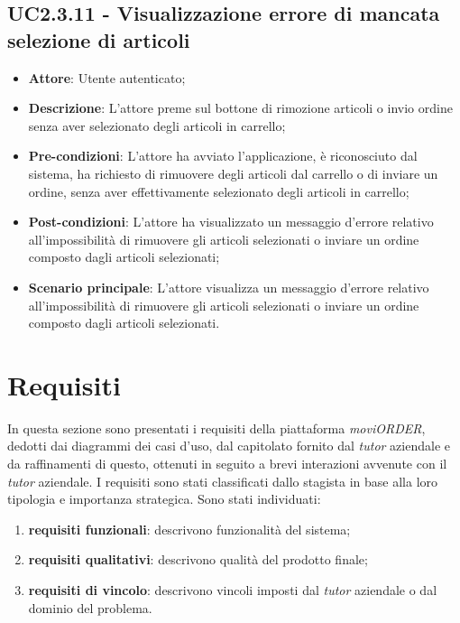 \subsection{UC2.3.11 - Visualizzazione errore di mancata selezione di articoli}

\begin{itemize}
	\item \textbf{Attore}: Utente autenticato;
	\item \textbf{Descrizione}: L'attore preme sul bottone di rimozione articoli o invio ordine senza aver selezionato degli articoli in carrello;
	\item \textbf{Pre-condizioni}: L'attore ha avviato l'applicazione, è riconosciuto dal sistema, ha richiesto di rimuovere degli articoli dal carrello o di inviare un ordine, senza aver effettivamente selezionato degli articoli in carrello;
	\item \textbf{Post-condizioni}: L'attore ha visualizzato un messaggio d'errore relativo all'impossibilità di rimuovere gli articoli selezionati o inviare un ordine composto dagli articoli selezionati;
	\item \textbf{Scenario principale}: L'attore visualizza un messaggio d'errore relativo all'impossibilità di rimuovere gli articoli selezionati o inviare un ordine composto dagli articoli selezionati.
\end{itemize}

\newpage

\section{Requisiti}

In questa sezione sono presentati i requisiti della piattaforma \textit{moviORDER}, dedotti dai diagrammi dei casi d'uso, dal capitolato fornito dal \textit{tutor} aziendale e da raffinamenti di questo, ottenuti in seguito a brevi interazioni avvenute con il \textit{tutor} aziendale. I requisiti sono stati classificati dallo stagista in base alla loro tipologia e importanza strategica. Sono stati individuati:
\begin{enumerate}
	\item \textbf{requisiti funzionali}: descrivono funzionalità del sistema;
	\item \textbf{requisiti qualitativi}: descrivono qualità del prodotto finale;
	\item \textbf{requisiti di vincolo}: descrivono vincoli imposti dal \textit{tutor} aziendale o dal dominio del problema.
\end{enumerate}

